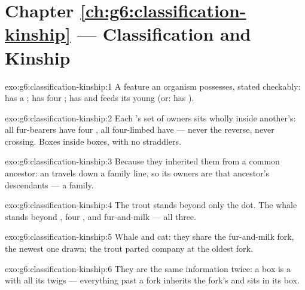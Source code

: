 \section*{Chapter \ref{ch:g6:classification-kinship} --- Classification and Kinship}

\begin{solution}{exo:g6:classification-kinship:1}
A feature an organism possesses, stated checkably: has a
; has four ; has  and feeds its young 
(or: has ).
\end{solution}

\begin{solution}{exo:g6:classification-kinship:2}
Each 's set of owners sits wholly inside another's:
all fur-bearers have four , all four-limbed 
have  --- never the reverse, never crossing. Boxes
inside boxes, with no straddlers.
\end{solution}

\begin{solution}{exo:g6:classification-kinship:3}
Because they inherited them from a common ancestor: an
 travels down a family line, so its owners are that
ancestor's descendants --- a family.
\end{solution}

\begin{solution}{exo:g6:classification-kinship:4}
The trout stands beyond only the  dot. The whale
stands beyond , four , and fur-and-milk ---
all three.
\end{solution}

\begin{solution}{exo:g6:classification-kinship:5}
Whale and cat: they share the fur-and-milk fork, the newest
one drawn; the trout parted company at the oldest fork.
\end{solution}

\begin{solution}{exo:g6:classification-kinship:6}
They are the same information twice: a box is a  with
all its twigs --- everything past a fork inherits the fork's
 and sits in its box.
\end{solution}

